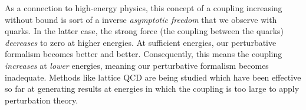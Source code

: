 As a connection to high-energy physics, this concept of a coupling increasing without bound is sort of a inverse \textit{asymptotic freedom} that we observe with quarks. In the latter case, the strong force (the coupling between the quarks) \textit{decreases} to zero at higher energies. At sufficient energies, our perturbative formalism becomes better and better. Consequently, this means the coupling \textit{increases} at \textit{lower} energies, meaning our perturbative formalism becomes inadequate. Methods like lattice QCD are being studied which have been effective so far at generating results at energies in which the coupling is too large to apply perturbation theory.


